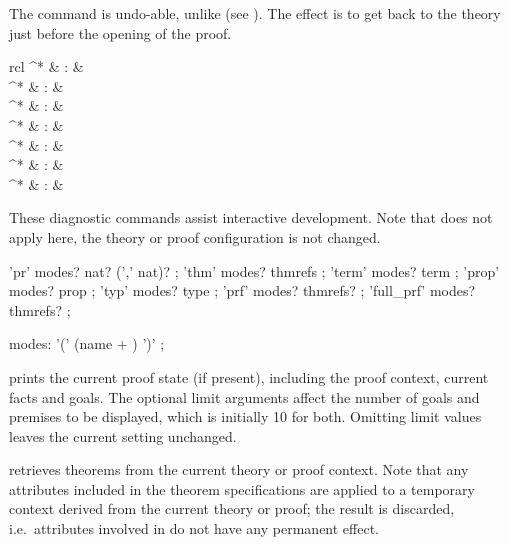 \begin{isabellebody}
\begin{isamarkuptext}
  \medskip The \mbox{} command is undo-able, unlike
  \mbox{} (see ).  The effect is to
  get back to the theory just before the opening of the proof.%
\end{isamarkuptext}%
\isamarkuptrue%
%
\isamarkuptrue%
%
\isamarkuptrue%
%
\begin{isamarkuptext}%
\begin{matharray}{rcl}
    ^* & : & \isarkeep{\cdot} \\
    ^* & : &  \\
    ^* & : &  \\
    ^* & : &  \\
    ^* & : &  \\
    ^* & : &  \\
    ^* & : &  \\
  \end{matharray}

  These diagnostic commands assist interactive development.  Note that
  \mbox{} does not apply here, the theory or proof
  configuration is not changed.

  \begin{rail}
    'pr' modes? nat? (',' nat)?
    ;
    'thm' modes? thmrefs
    ;
    'term' modes? term
    ;
    'prop' modes? prop
    ;
    'typ' modes? type
    ;
    'prf' modes? thmrefs?
    ;
    'full\_prf' modes? thmrefs?
    ;

    modes: '(' (name + ) ')'
    ;
  \end{rail}

  \begin{descr}

  \item [\mbox{\isa{\isacommand{pr}}}~\isa{{\isachardoublequote}goals{\isacharcomma}\ prems{\isachardoublequote}}] prints the current
  proof state (if present), including the proof context, current facts
  and goals.  The optional limit arguments affect the number of goals
  and premises to be displayed, which is initially 10 for both.
  Omitting limit values leaves the current setting unchanged.

  \item [\mbox{\isa{\isacommand{thm}}}~\isa{{\isachardoublequote}a\isactrlsub {\isadigit{1}}\ {\isasymdots}\ a\isactrlsub n{\isachardoublequote}}] retrieves
  theorems from the current theory or proof context.  Note that any
  attributes included in the theorem specifications are applied to a
  temporary context derived from the current theory or proof; the
  result is discarded, i.e.\ attributes involved in  do not have any permanent effect.


\end{descr}
\end{isamarkuptext}
\end{isabellebody}
